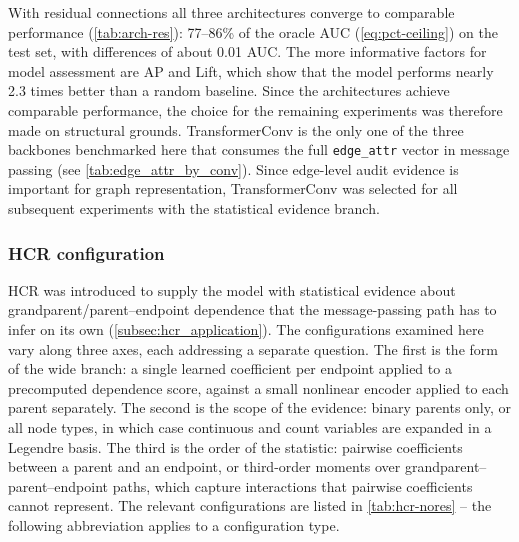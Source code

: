     With residual connections all three architectures converge to comparable
    performance (\cref{tab:arch-res}): 77--86\% of the oracle AUC
    (\cref{eq:pct-ceiling}) on the test
    set, with differences of about 0.01 AUC. The more informative factors for model assessment are AP and 
    Lift, which show that the model performs nearly 2.3 times better than a random baseline. 
    Since the architectures achieve comparable performance, the choice for 
    the remaining experiments 
    was therefore made on structural grounds. TransformerConv is the only one of the three
    backbones benchmarked here that consumes the full \texttt{edge\_attr} vector in message
    passing (see \cref{tab:edge_attr_by_conv}).
    Since edge-level audit evidence is important for graph representation, 
    TransformerConv was
    selected for all subsequent experiments with the statistical evidence branch.

\subsubsection{HCR configuration}

HCR was introduced to supply the model with statistical evidence about
grandparent/parent--endpoint dependence that the message-passing path has to infer on
its own (\cref{subsec:hcr_application}). The configurations examined here
vary along three axes, each addressing a separate question. The first is the
form of the wide branch: a single learned coefficient per endpoint applied
to a precomputed dependence score, against a small nonlinear encoder applied
to each parent separately. The second is the scope of the evidence: binary
parents only, or all node types, in which case continuous and count
variables are expanded in a Legendre basis. The third is the order of the
statistic: pairwise coefficients between a parent and an endpoint, or
third-order moments over grandparent--parent--endpoint paths, which capture
interactions that pairwise coefficients cannot represent. The relevant 
configurations are listed in \cref{tab:hcr-nores} -- the following abbreviation applies
to a configuration type.

